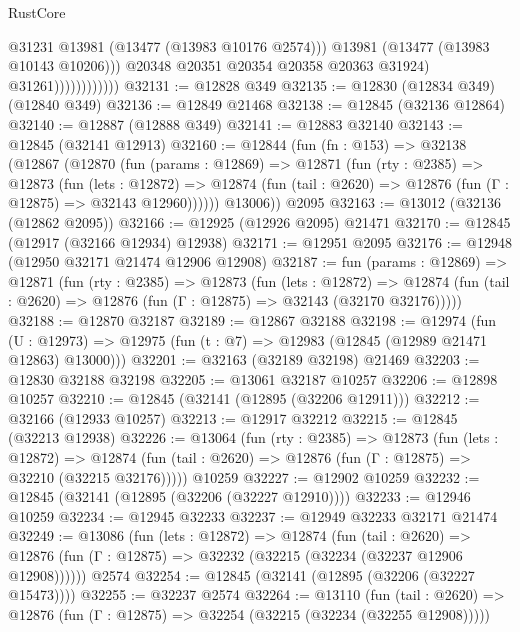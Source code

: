 \begin{lexlean}{RustCore}
\begin{coremodule}
                                  @31231
                                  @13981
                                  (@13477 (@13983 @10176 @2574)))
                                @13981
                                (@13477 (@13983 @10143 @10206)))
                              @20348
                              @20351
                              @20354
                              @20358
                              @20363
                              @31924)
                            @31261))))))))))))
@32131 := @12828 @349
@32135 := @12830 (@12834 @349) (@12840 @349)
@32136 := @12849 @21468
@32138 := @12845 (@32136 @12864)
@32140 := @12887 (@12888 @349)
@32141 := @12883 @32140
@32143 := @12845 (@32141 @12913)
@32160 := @12844
    (fun (fn : @153) =>
    @32138
      (@12867
        (@12870
          (fun (params : @12869) =>
          @12871
            (fun (rty : @2385) =>
            @12873
              (fun (lets : @12872) =>
              @12874 (fun (tail : @2620) => @12876 (fun (Γ : @12875) => @32143 @12960))))))
        @13006))
    @2095
@32163 := @13012 (@32136 (@12862 @2095))
@32166 := @12925 (@12926 @2095) @21471
@32170 := @12845 (@12917 (@32166 @12934) @12938)
@32171 := @12951 @2095
@32176 := @12948 (@12950 @32171 @21474 @12906 @12908)
@32187 := fun (params : @12869) =>
  @12871
    (fun (rty : @2385) =>
    @12873
      (fun (lets : @12872) =>
      @12874 (fun (tail : @2620) => @12876 (fun (Γ : @12875) => @32143 (@32170 @32176)))))
@32188 := @12870 @32187
@32189 := @12867 @32188
@32198 := @12974
    (fun (U : @12973) => @12975 (fun (t : @7) => @12983 (@12845 (@12989 @21471 @12863) @13000)))
@32201 := @32163 (@32189 @32198) @21469
@32203 := @12830 @32188 @32198
@32205 := @13061 @32187 @10257
@32206 := @12898 @10257
@32210 := @12845 (@32141 (@12895 (@32206 @12911)))
@32212 := @32166 (@12933 @10257)
@32213 := @12917 @32212
@32215 := @12845 (@32213 @12938)
@32226 := @13064
    (fun (rty : @2385) =>
    @12873
      (fun (lets : @12872) =>
      @12874 (fun (tail : @2620) => @12876 (fun (Γ : @12875) => @32210 (@32215 @32176)))))
    @10259
@32227 := @12902 @10259
@32232 := @12845 (@32141 (@12895 (@32206 (@32227 @12910))))
@32233 := @12946 @10259
@32234 := @12945 @32233
@32237 := @12949 @32233 @32171 @21474
@32249 := @13086
    (fun (lets : @12872) =>
    @12874
      (fun (tail : @2620) =>
      @12876 (fun (Γ : @12875) => @32232 (@32215 (@32234 (@32237 @12906 @12908))))))
    @2574
@32254 := @12845 (@32141 (@12895 (@32206 (@32227 @15473))))
@32255 := @32237 @2574
@32264 := @13110
    (fun (tail : @2620) => @12876 (fun (Γ : @12875) => @32254 (@32215 (@32234 (@32255 @12908)))))

\end{coremodule}
\end{lexlean}
